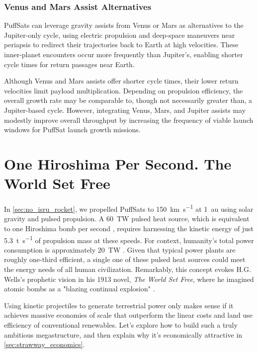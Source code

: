 \documentclass{article}
\begin{document}
{\subsubsection{Venus and Mars Assist Alternatives}
PuffSats can leverage gravity assists from Venus or Mars as alternatives to the Jupiter-only cycle, using electric propulsion and deep-space maneuvers near periapsis to redirect their trajectories back to Earth at high velocities. These inner-planet encounters occur more frequently than Jupiter’s, enabling shorter cycle times for return passages near Earth.

Although Venus and Mars assists offer shorter cycle times, their lower return velocities limit payload multiplication. Depending on propulsion efficiency, the overall growth rate may be comparable to, though not necessarily greater than, a Jupiter-based cycle. However, integrating Venus, Mars, and Jupiter assists may modestly improve overall throughput by increasing the frequency of viable launch windows for PuffSat launch growth missions.

\section{One Hiroshima Per Second. The World Set Free}\label{sec:world_set_free}
In \autoref{sec:no_isru_rocket}, we propelled PuffSats to \SI{150}{\kilo\meter\per\second} at \SI{1}{\astronomicalunit} using solar gravity and pulsed propulsion. A \SI{60}{\tera\watt} pulsed heat source, which is equivalent to one Hiroshima bomb per second \cite{hiroshima}, requires harnessing the kinetic energy of just \SI{5.3}{\tonne\per\second} of propulsion mass at these speeds. For context, humanity's total power consumption is approximately \SI{20}{\tera\watt} \cite{owid-energy-production-consumption}. Given that typical power plants are roughly one-third efficient, a single one of these pulsed heat sources could meet the energy needs of all human civilization.  Remarkably, this concept evokes H.G. Wells's prophetic vision in his 1913 novel, \textit{The World Set Free}, where he imagined atomic bombs as a "blazing continual explosion" \cite{wells1914world}.  

Using kinetic projectiles to generate terrestrial power only makes sense if it achieves massive economies of scale that outperform the linear costs and land use efficiency of conventional renewables.  Let's explore how to build such a truly ambitious megastructure, and then explain why it's economically attractive in \autoref{sec:strawway_economics}.     

}
\end{document}

